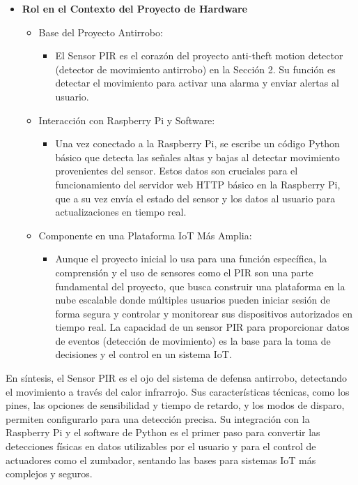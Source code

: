 \documentclass{report}
\begin{document}
\begin{itemize}
    \item \textbf{Rol en el Contexto del Proyecto de Hardware}
    \begin{itemize}
        \item Base del Proyecto Antirrobo:
        \begin{itemize}
            \item El Sensor PIR es el corazón del proyecto anti-theft motion detector (detector de movimiento antirrobo) en la Sección 2. Su función es 
            detectar el movimiento para activar una alarma y enviar alertas al usuario.
        \end{itemize}
        \item Interacción con Raspberry Pi y Software:
        \begin{itemize}
            \item Una vez conectado a la Raspberry Pi, se escribe un código Python básico que detecta las señales altas y bajas al detectar movimiento 
            provenientes del sensor. Estos datos son cruciales para el funcionamiento del servidor web HTTP básico en la Raspberry Pi, que a su vez envía 
            el estado del sensor y los datos al usuario para actualizaciones en tiempo real.
        \end{itemize}
        \item Componente en una Plataforma IoT Más Amplia:
        \begin{itemize}
            \item Aunque el proyecto inicial lo usa para una función específica, la comprensión y el uso de sensores como el PIR son una parte fundamental 
            del proyecto, que busca construir una plataforma en la nube escalable donde múltiples usuarios pueden iniciar sesión de forma segura y controlar 
            y monitorear sus dispositivos autorizados en tiempo real. La capacidad de un sensor PIR para proporcionar datos de eventos (detección de 
            movimiento) es la base para la toma de decisiones y el control en un sistema IoT.
        \end{itemize}
    \end{itemize}
\end{itemize}
En síntesis, el Sensor PIR es el ojo del sistema de defensa antirrobo, detectando el movimiento a través del calor infrarrojo. Sus características técnicas, 
como los pines, las opciones de sensibilidad y tiempo de retardo, y los modos de disparo, permiten configurarlo para una detección precisa. Su integración 
con la Raspberry Pi y el software de Python es el primer paso para convertir las detecciones físicas en datos utilizables por el usuario y para el control 
de actuadores como el zumbador, sentando las bases para sistemas IoT más complejos y seguros.
\end{document}

